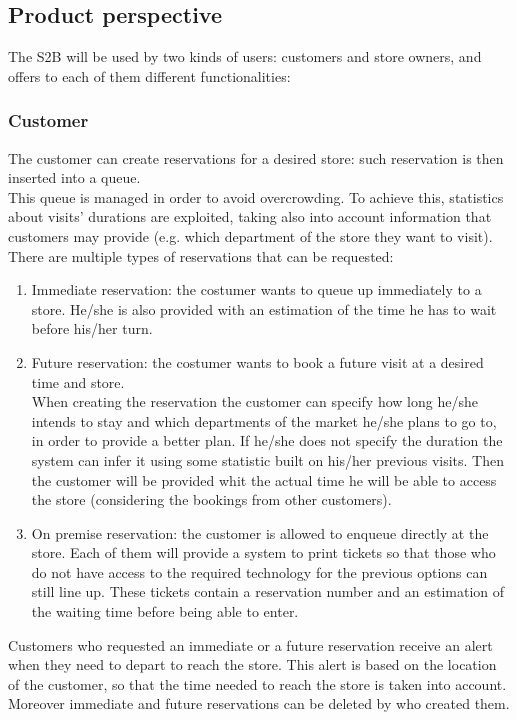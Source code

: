\subsection{Product perspective}
The S2B will be used by two kinds of users: customers and store owners, and offers to each of them different functionalities:
\subsubsection{Customer}
The customer can create reservations for a desired store: such reservation is then inserted into a queue.\\This queue is managed in order to avoid overcrowding. To achieve this, statistics about visits' durations are exploited, taking also into account information that customers may provide (e.g. which department of the store they want to visit).\\
There are multiple types of reservations that can be requested:
\begin{enumerate}
	\item Immediate reservation: the costumer wants to queue up immediately to a store. He/she is also provided with an estimation of the time he has to wait before his/her turn.
	\item Future reservation: the costumer wants to book a future visit at a desired time and store.\\ When creating the reservation the customer can specify how long he/she intends to stay and which departments of the market he/she plans to go to, in order to provide a better plan. If he/she does not specify the duration the system can infer it using some statistic built on his/her previous visits. Then the customer will be provided whit the actual time he will be able to access the store (considering the bookings from other customers).
	\item On premise reservation: the customer is allowed to enqueue directly at the store. Each of them will provide a system to print tickets so that those who do not have access to the required technology for the previous options can still line up. These tickets contain a reservation number and an estimation of the waiting time before being able to enter.
\end{enumerate}
Customers who requested an immediate or a future reservation receive an alert when they need to depart to reach the store.
This alert is based on the location of the customer, so that the time needed to reach the store is taken into account. Moreover immediate and future reservations can be deleted by who created them.\\

